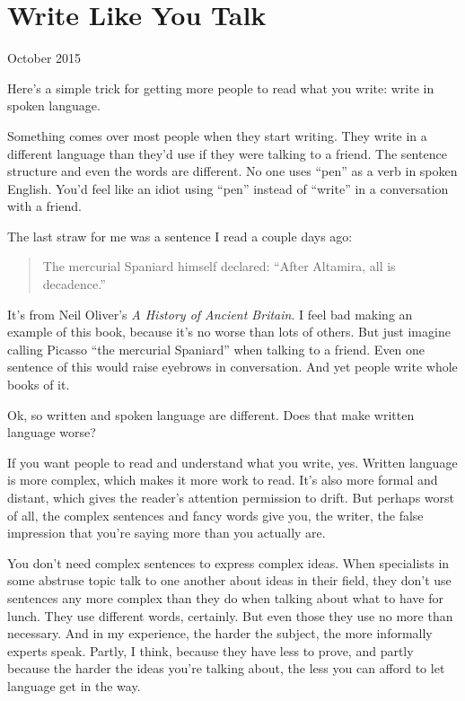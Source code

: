 \chapter{Write Like You Talk}

October 2015

Here's a simple trick for getting more people to read what you write:
write in spoken language.

Something comes over most people when they start writing. They write in
a different language than they'd use if they were talking to a friend.
The sentence structure and even the words are different. No one uses
``pen'' as a verb in spoken English. You'd feel like an idiot using
``pen'' instead of ``write'' in a conversation with a friend.

The last straw for me was a sentence I read a couple days ago:

\begin{quote}
The mercurial Spaniard himself declared: ``After Altamira, all is
decadence.''
\end{quote}

It's from Neil Oliver's \emph{A History of Ancient Britain}. I feel bad
making an example of this book, because it's no worse than lots of
others. But just imagine calling Picasso ``the mercurial Spaniard'' when
talking to a friend. Even one sentence of this would raise eyebrows in
conversation. And yet people write whole books of it.

Ok, so written and spoken language are different. Does that make written
language worse?

If you want people to read and understand what you write, yes. Written
language is more complex, which makes it more work to read. It's also
more formal and distant, which gives the reader's attention permission
to drift. But perhaps worst of all, the complex sentences and fancy
words give you, the writer, the false impression that you're saying more
than you actually are.

You don't need complex sentences to express complex ideas. When
specialists in some abstruse topic talk to one another about ideas in
their field, they don't use sentences any more complex than they do when
talking about what to have for lunch. They use different words,
certainly. But even those they use no more than necessary. And in my
experience, the harder the subject, the more informally experts speak.
Partly, I think, because they have less to prove, and partly because the
harder the ideas you're talking about, the less you can afford to let
language get in the way.

